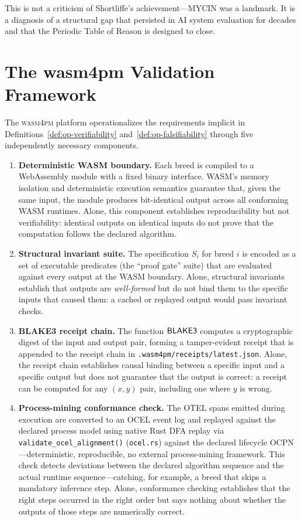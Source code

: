 This is not a criticism of Shortliffe's achievement—MYCIN was a landmark.  It is
a diagnosis of a structural gap that persisted in AI system evaluation for decades
and that the Periodic Table of Reason is designed to close.

\section{The wasm4pm Validation Framework}
\label{sec:wasm4pm-framework}

The \textsc{wasm4pm} platform operationalizes the requirements implicit in
Definitions~\ref{def:op-verifiability} and~\ref{def:op-falsifiability} through
five independently necessary components.

\begin{enumerate}[label=(\roman*)]

\item \textbf{Deterministic WASM boundary.}  Each breed is compiled to a
WebAssembly module with a fixed binary interface.  WASM's memory isolation and
deterministic execution semantics guarantee that, given the same input, the module
produces bit-identical output across all conforming WASM runtimes.  Alone, this
component establishes reproducibility but not verifiability: identical outputs on
identical inputs do not prove that the computation follows the declared algorithm.

\item \textbf{Structural invariant suite.}  The specification $S_i$ for breed $i$
is encoded as a set of executable predicates (the ``proof gate'' suite) that are
evaluated against every output at the WASM boundary.  Alone, structural invariants
establish that outputs are \emph{well-formed} but do not bind them to the specific
inputs that caused them: a cached or replayed output would pass invariant checks.

\item \textbf{BLAKE3 receipt chain.}  The function $\mathsf{BLAKE3}$ computes a
cryptographic digest of the input and output pair, forming a tamper-evident receipt
that is appended to the receipt chain in \texttt{.wasm4pm/receipts/latest.json}.
Alone, the receipt chain establishes causal binding between a specific input and a
specific output but does not guarantee that the output is correct: a receipt can be
computed for any $(x, y)$ pair, including one where $y$ is wrong.

\item \textbf{Process-mining conformance check.}  The OTEL spans emitted during
execution are converted to an OCEL event log and replayed against the declared
process model using native Rust DFA replay via \texttt{validate\_ocel\_alignment()} (\texttt{ocel.rs}) against the declared lifecycle OCPN---deterministic, reproducible, no external process-mining framework.  This check detects deviations between the
declared algorithm sequence and the actual runtime sequence—catching, for example,
a breed that skips a mandatory inference step.  Alone, conformance checking
establishes that the right steps occurred in the right order but says nothing about
whether the outputs of those steps are numerically correct.


\end{enumerate}
